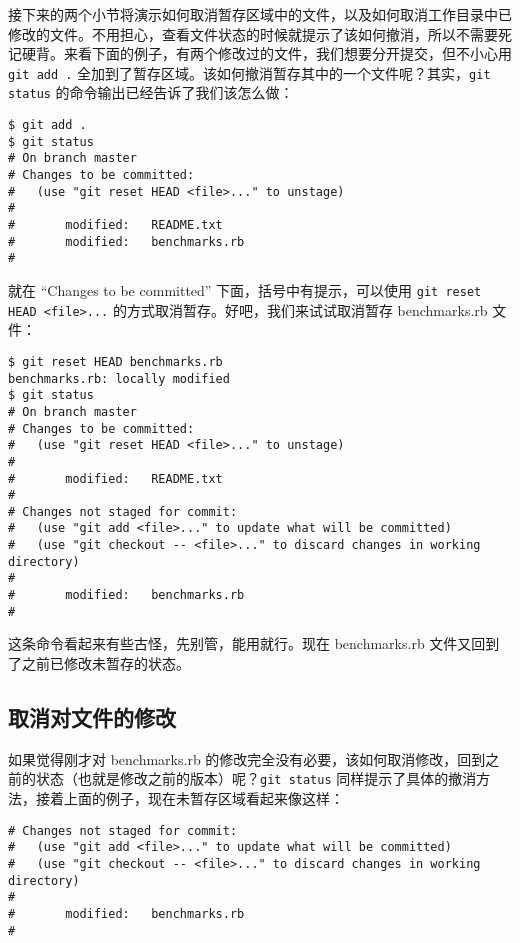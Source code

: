 \documentclass[a4paper]{book}
\begin{document}
接下来的两个小节将演示如何取消暂存区域中的文件，以及如何取消工作目录中已修改的文件。不用担心，查看文件状态的时候就提示了该如何撤消，所以不需要死记硬背。来看下面的例子，有两个修改过的文件，我们想要分开提交，但不小心用 \texttt{git add .} 全加到了暂存区域。该如何撤消暂存其中的一个文件呢？其实，\texttt{git status} 的命令输出已经告诉了我们该怎么做：

\begin{shaded}\begin{verbatim}
$ git add .
$ git status
# On branch master
# Changes to be committed:
#   (use "git reset HEAD <file>..." to unstage)
#
#       modified:   README.txt
#       modified:   benchmarks.rb
#
\end{verbatim}\end{shaded}

就在 “Changes to be committed” 下面，括号中有提示，可以使用 \texttt{git reset HEAD \textless{}file\textgreater{}...} 的方式取消暂存。好吧，我们来试试取消暂存 benchmarks.rb 文件：

\begin{shaded}\begin{verbatim}
$ git reset HEAD benchmarks.rb
benchmarks.rb: locally modified
$ git status
# On branch master
# Changes to be committed:
#   (use "git reset HEAD <file>..." to unstage)
#
#       modified:   README.txt
#
# Changes not staged for commit:
#   (use "git add <file>..." to update what will be committed)
#   (use "git checkout -- <file>..." to discard changes in working directory)
#
#       modified:   benchmarks.rb
#
\end{verbatim}\end{shaded}

这条命令看起来有些古怪，先别管，能用就行。现在 benchmarks.rb 文件又回到了之前已修改未暂存的状态。

\subsection{取消对文件的修改}

如果觉得刚才对 benchmarks.rb 的修改完全没有必要，该如何取消修改，回到之前的状态（也就是修改之前的版本）呢？\texttt{git status} 同样提示了具体的撤消方法，接着上面的例子，现在未暂存区域看起来像这样：

\begin{shaded}\begin{verbatim}
# Changes not staged for commit:
#   (use "git add <file>..." to update what will be committed)
#   (use "git checkout -- <file>..." to discard changes in working directory)
#
#       modified:   benchmarks.rb
#
\end{verbatim}\end{shaded}
\end{document}
